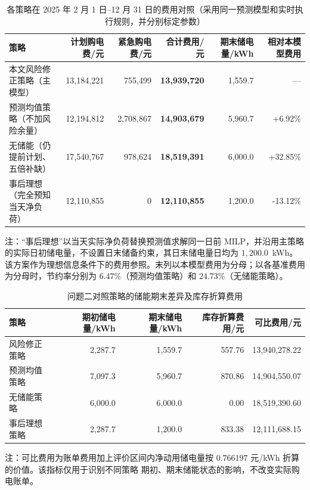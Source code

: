 
\begin{table}[htbp]
  \centering
  \caption{各策略在 2025 年 2 月 1 日--12 月 31 日的费用对照（采用同一预测模型和实时执行规则，并分别标定参数）}
  \label{tab:p2-strategy}
  \small
  \begin{tabular}{lrrrrr}
    \toprule
    策略 & 计划购电费/元 & 紧急购电费/元 & 合计费用/元 & 期末储电量/kWh & 相对本模型费用 \\
    \midrule
    本文风险修正策略（主模型） & 13,184,221 & 755,499 & \textbf{13,939,720} & 1,559.7 & --- \\
    预测均值策略（不加风险余量） & 12,194,812 & 2,708,867 & \textbf{14,903,679} & 5,960.7 & +6.92\% \\
    无储能（仍提前计划、五倍补缺） & 17,540,767 & 978,624 & \textbf{18,519,391} & 6,000.0 & +32.85\% \\
    事后理想（完全预知当天净负荷） & 12,110,855 & 0 & \textbf{12,110,855} & 1,200.0 & -13.12\% \\
    \bottomrule
  \end{tabular}
  \par\vspace{2pt}
  \begin{minipage}{\textwidth}\footnotesize
    注：“事后理想”以当天实际净负荷替换预测值求解同一日前 MILP，并沿用主策略的实际日初储电量，不设置日末储备约束，其日末储电量日均为 $1,200.0$~kWh。该方案作为理想信息条件下的费用参照。末列以本模型费用为分母；以各基准费用为分母时，节约率分别为 $6.47\%$（预测均值策略）和 $24.73\%$（无储能策略）。
  \end{minipage}
\end{table}

\begin{table}[htbp]
  \centering
  \caption{问题二对照策略的储能期末差异及库存折算费用}
  \label{tab:p2-inventory}
  \small
  \begin{tabular}{lrrrr}
    \toprule
    策略 & 期初储电量/kWh & 期末储电量/kWh & 库存折算费用/元 & 可比费用/元 \\
    \midrule
    风险修正策略 & 2,287.7 & 1,559.7 & 557.76 & 13,940,278.22 \\
    预测均值策略 & 7,097.3 & 5,960.7 & 870.86 & 14,904,550.07 \\
    无储能策略 & 6,000.0 & 6,000.0 & 0.00 & 18,519,390.60 \\
    事后理想策略 & 2,287.7 & 1,200.0 & 833.38 & 12,111,688.15 \\
    \bottomrule
  \end{tabular}
  \par\vspace{2pt}
  \begin{minipage}{\textwidth}\footnotesize
    注：可比费用为账单费用加上评价区间内净动用储电量按
    $0.766197$ 元/kWh 折算的价值。该指标仅用于识别不同策略
    期初、期末储能状态的影响，不改变实际购电账单。
  \end{minipage}
\end{table}


